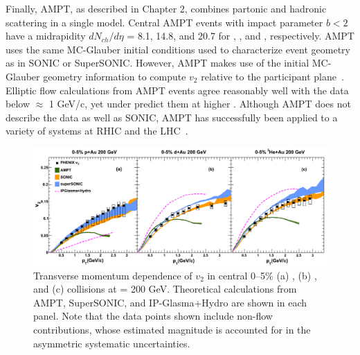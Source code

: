 Finally, AMPT, as described in Chapter 2, combines partonic and hadronic scattering in a single model. Central AMPT events with impact parameter $b<2$ have a midrapidity $dN_{ch}/d\eta$ = 8.1, 14.8, and 20.7 for \pau, \dau, and \hau, respectively. AMPT uses the same MC-Glauber initial conditions used to characterize event geometry as in SONIC or SuperSONIC. However, AMPT makes use of the initial MC-Glauber geometry information to compute $v_2$ relative to the participant plane~\cite{PhysRevC.92.054903}. Elliptic flow calculations from AMPT events agree reasonably well with the data below \pt $\approx$ 1 GeV/c, yet under predict them at higher \pt. Although AMPT does not describe the data as well as SONIC, AMPT has successfully been applied to a variety of systems at RHIC and the LHC~\cite{PhysRevC.93.054911}. 

\begin{figure}[!ht]
\begin{center}
\includegraphics[width=1.0\linewidth]{figs/indepth_theory_comparison.png}
\caption{Transverse momentum dependence of $v_2$ in central 0--5\% (a) \pau, (b) \dau, and (c) \hau collisions at \sqsn = 200 GeV. Theoretical calculations from AMPT, SuperSONIC, and IP-Glasma+Hydro are shown in each panel. Note that the data points shown include non-flow contributions, whose estimated magnitude is accounted for in the asymmetric systematic uncertainties.}
\label{fig:indepth_comp_three}
\end{center}
\end{figure}

